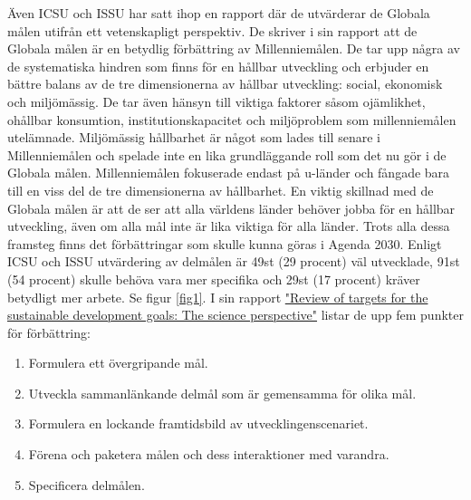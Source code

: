\documentclass{report}
\begin{document}
Även ICSU och ISSU har satt ihop en rapport där de utvärderar de Globala målen utifrån ett vetenskapligt perspektiv. De skriver i sin rapport att de Globala målen är en betydlig förbättring av Millenniemålen.  De tar upp några av de systematiska hindren som finns för en hållbar utveckling och erbjuder en bättre balans av de tre dimensionerna av hållbar utveckling: social, ekonomisk och miljömässig. De tar även hänsyn till viktiga faktorer såsom ojämlikhet, ohållbar konsumtion, institutionskapacitet och miljöproblem som millenniemålen utelämnade. Miljömässig hållbarhet är något som lades till senare i Millenniemålen och spelade inte en lika grundläggande roll som det nu gör i de Globala målen. Millenniemålen fokuserade endast på u-länder och fångade bara till en viss del de tre dimensionerna av hållbarhet. En viktig skillnad med de Globala målen är att de ser att alla världens länder behöver jobba för en hållbar utveckling, även om alla mål inte är lika viktiga för alla länder. Trots alla dessa framsteg finns det förbättringar som skulle kunna göras i Agenda 2030. Enligt ICSU och ISSU utvärdering av delmålen är 49st (29 procent) väl utvecklade, 91st (54 procent) skulle behöva vara mer specifika och 29st (17 procent) kräver betydligt mer arbete. Se figur \ref{fig1}. 
I sin rapport \href{http://www.icsu.org/publications/reports-and-reviews/review-of-targets-for-the-sustainable-development-goals-the-science-perspective-2015/SDG-Report.pdf}{"Review of targets for the sustainable development goals: The science perspective"} listar de upp fem punkter för förbättring:  

\begin{enumerate} \label{forbattring}
\item Formulera ett övergripande mål.
\label{improvment1}
\item Utveckla sammanlänkande delmål som är gemensamma för olika mål. 
\label{improvment2}
 \item Formulera en lockande framtidsbild av utvecklingenscenariet.
 \label{improvment3} 
\item Förena och paketera målen och dess interaktioner med varandra. \label{improvment4}
\item Specificera delmålen.
\label{improvment5} \cite{review}
\end{enumerate} \\
\end{document}
